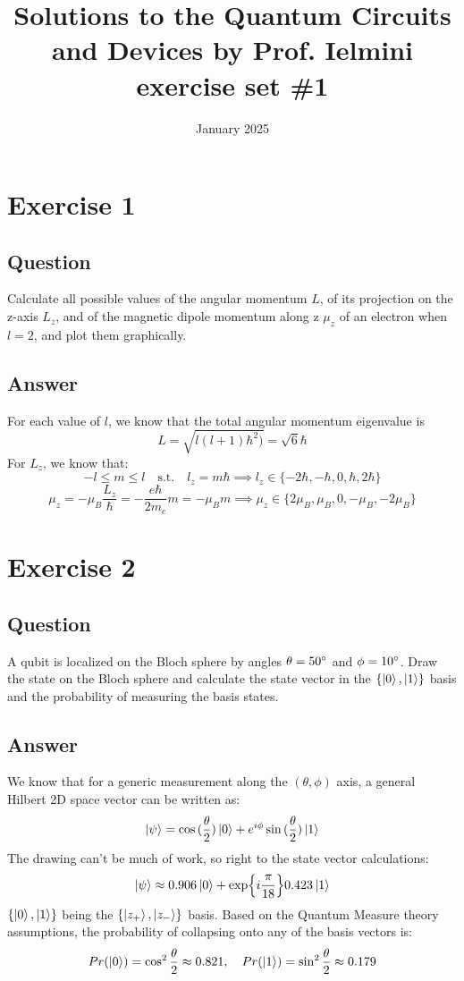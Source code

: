 \documentclass{article}
\title{Solutions to the Quantum Circuits and Devices by Prof. Ielmini exercise set \#1}
\author{}
\date{January 2025}
\begin{document}
\maketitle

\section{Exercise 1}
\subsection{Question}
Calculate all possible values of the angular momentum $L$, of its projection on the z-axis $L_z$, and of the magnetic dipole momentum along z $\mu_z$ of an electron when $l = 2$, and plot them graphically. 
\subsection{Answer}
For each value of $l$, we know that the total angular momentum eigenvalue is 
$$L = \sqrt{l(l+1)\hbar^2)} = \sqrt{6}\hbar$$
For $L_z$, we know that:
$$-l \le m \le l \quad \text{s.t.} \quad l_z = m\hbar \implies l_z \in \{-2\hbar,-\hbar,0,\hbar,2\hbar\}$$
$$\mu_z = -\mu_B \frac{L_z}{\hbar} = -\frac{e\hbar}{2m_e}m = -\mu_B m \implies \mu_z \in \{ 2\mu_B, \mu_B, 0, -\mu_B, -2\mu_B \}$$

\section{Exercise 2}
\subsection{Question}
A qubit is localized on the Bloch sphere by angles $\theta = 50\degree{}$ and $\phi = 10\degree{}$. Draw the state on the Bloch sphere and calculate the state vector in the $\{ \ket{0}, \ket{1}\}$ basis and the probability of measuring the basis states.
\subsection{Answer}
We know that for a generic measurement along the $(\theta, \phi)$ axis, a general Hilbert 2D space vector can be written as:
$$\ket{\psi} = \cos{(\frac{\theta}{2})}\ket{0} + e^{i\phi}\sin{(\frac{\theta}{2})}\ket{1}$$
The drawing can't be much of work, so right to the state vector calculations:
$$\ket{\psi} \approx 0.906\ket{0} + \exp{i\frac{\pi}{18}}0.423\ket{1}$$
$\{ \ket{0}, \ket{1}\}$ being the $\{ \ket{z_+}, \ket{z_-}\}$ basis.
Based on the Quantum Measure theory assumptions, the probability of collapsing onto any of the basis vectors is:
$$Pr(\ket{0}) = \cos^2{\frac{\theta}{2}}  \approx 0.821, \quad Pr(\ket{1}) = \sin^2{\frac{\theta}{2}} \approx 0.179$$
\end{document}
